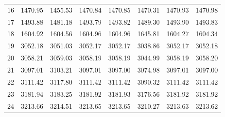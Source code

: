 \documentclass[10pt,oneside]{article}
\begin{document}
\begin{table}[h!]
\begin{tabular}{cccccccc}
16 &   1470.95 & 1455.53 & 1470.84 & 1470.85 &      1470.31 & 1470.93 & 1470.98 \\
17 &   1493.88 & 1481.18 & 1493.79 & 1493.82 &      1489.30 & 1493.90 & 1493.83 \\
18 &   1604.92 & 1604.56 & 1604.96 & 1604.96 &      1645.81 & 1604.27 & 1604.34 \\
19 &   3052.18 & 3051.03 & 3052.17 & 3052.17 &      3038.86 & 3052.17 & 3052.18 \\
20 &   3058.21 & 3059.03 & 3058.19 & 3058.19 &      3044.99 & 3058.19 & 3058.20 \\
21 &   3097.01 & 3103.21 & 3097.01 & 3097.00 &      3074.98 & 3097.01 & 3097.00 \\
22 &   3111.42 & 3117.80 & 3111.42 & 3111.42 &      3090.32 & 3111.42 & 3111.42 \\
23 &   3181.94 & 3183.25 & 3181.92 & 3181.93 &      3176.56 & 3181.92 & 3181.92 \\
24 &   3213.66 & 3214.51 & 3213.65 & 3213.65 &      3210.27 & 3213.63 & 3213.62 \\
\bottomrule
\end{tabular}
\end{table}

\clearpage
\end{document}
